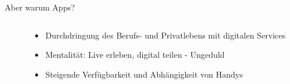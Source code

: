 \documentclass[aspectratio=169,t]{beamer}
\begin{document}
\begin{frame}{Aber warum Apps?}
    \begin{columns}
        \begin{column}{0.5\textwidth}
        \end{column}
        \begin{column}{0.5\textwidth}
            \begin{itemize}
                \item<3-> Durchdringung des Berufs- und Privatlebens mit digitalen Services
                \item<3-> Mentalität: Live erleben, digital teilen - Ungeduld
                \item<4-> Steigende Verfügbarkeit und Abhängigkeit von Handys
            \end{itemize}
        \end{column}
    \end{columns}
\end{frame}
\end{document}
